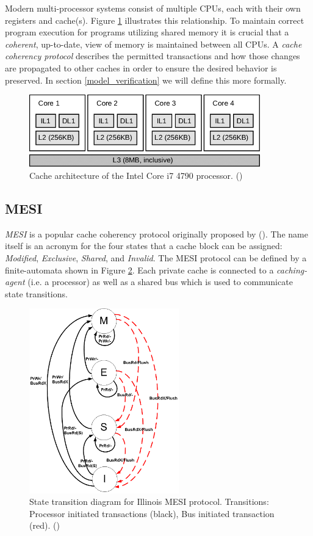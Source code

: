 \documentclass[12pt]{article}
\begin{document}
Modern multi-processor systems consist of multiple CPUs, each with their own registers and cache(s). Figure \ref{fig:cachediagram} illustrates this relationship. To maintain correct program execution for programs utilizing shared memory it is crucial that a \textit{coherent}, up-to-date, view of memory is maintained between all CPUs. A \textit{cache coherency protocol} describes the permitted transactions and how those changes are propagated to other caches in order to ensure the desired behavior is preserved. In section \ref{model_verification} we will define this more formally.

\begin{figure}[h!]
    \centering
    \includegraphics[width=10cm]{images/Intel-Core-i7-cache-architecture.png}
    \caption{Cache architecture of the Intel Core i7 4790 processor. (\cite{nakamoto2018})}
    \label{fig:cachediagram}
\end{figure}

\subsection{MESI}

\textit{MESI} is a popular cache coherency protocol originally proposed by (\cite{papamarcos1984}). The name itself is an acronym for the four states that a cache block can be assigned: \textit{Modified}, \textit{Exclusive}, \textit{Shared}, and \textit{Invalid}. The MESI protocol can be defined by a finite-automata shown in Figure \ref{fig:statetransitiondiagram}. Each private cache is connected to a \textit{caching-agent} (i.e. a processor) as well as a shared bus which is used to communicate state transitions.

\begin{figure}[h!]
    \centering
    \includegraphics[height=8cm]{images/State_transition_diagram_for_the_Illinois_MESI_protocol.png}
    \caption{State transition diagram for Illinois MESI protocol. Transitions: Processor initiated transactions (black), Bus initiated transaction (red). (\cite{culler1998})}
    \label{fig:statetransitiondiagram}
\end{figure}
\end{document}
